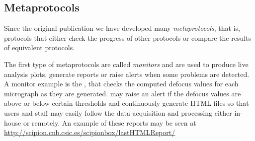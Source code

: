 



\subsection{Metaprotocols}
Since the \scipion original publication we have developed many \emph{metaprotocols}, that is, 
protocols that either check the progress of other protocols or compare the results of equivalent protocols.

The first type of metaprotocols are called \emph{monitors} and are used to produce live analysis plots, generate reports or raise alerts when some problems are detected. A monitor example is the , that checks the computed defocus values for each micrograph as they are generated.  may raise an alert if the defocus values are above or below certain thresholds and continuously generate HTML files so that users and staff may easily follow the data acquisition and processing either in-house or remotely. An example of these reports may be seen at \url{http://scipion.cnb.csic.es/scipionbox/lastHTMLReport/}%

